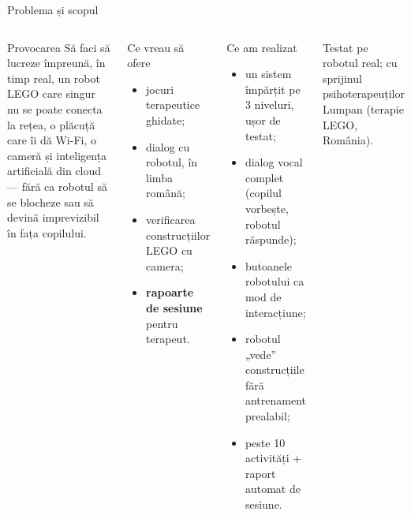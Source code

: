 \documentclass[aspectratio=169,11pt]{beamer}
\begin{document}
\begin{frame}{Problema și scopul}
  \begin{columns}[T]
    \begin{alertblock}{Provocarea}
      Să faci să lucreze împreună, în timp real, un robot LEGO care singur nu se poate conecta la rețea, o plăcuță care îi dă Wi-Fi, o cameră și inteligența artificială din cloud — fără ca robotul să se blocheze sau să devină imprevizibil în fața copilului.
    \end{alertblock}
    \begin{block}{Ce vreau să ofere}
      \begin{itemize}
        \item jocuri terapeutice ghidate;
        \item dialog cu robotul, în limba română;
        \item verificarea construcțiilor LEGO cu camera;
        \item \textbf{rapoarte de sesiune} pentru terapeut.
      \end{itemize}
    \end{block}
    \begin{block}{Ce am realizat}
      \small
      \begin{itemize}
        \item un sistem împărțit pe 3 niveluri, ușor de testat;
        \item dialog vocal complet (copilul vorbește, robotul răspunde);
        \item butoanele robotului ca mod de interacțiune;
        \item robotul „vede” construcțiile fără antrenament prealabil;
        \item peste 10 activități + raport automat de sesiune.
      \end{itemize}
    \end{block}
    {\scriptsize Testat pe robotul real; cu sprijinul psihoterapeuților Lumpan (terapie LEGO, România).}
  \end{columns}
\end{frame}
\end{document}
